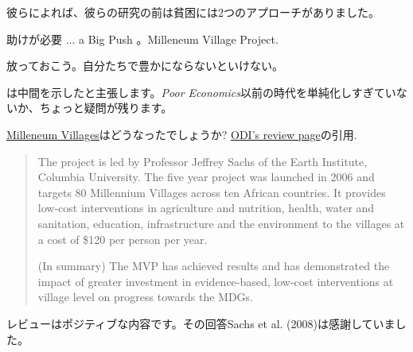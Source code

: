 \begin{frame}{}
彼らによれば\citep{BanerjeeDuflo2011book}、彼らの研究の前は貧困には2つのアプローチがありました。
\pause
\begin{description}[<+->]
\vspace{1.0ex}\setlength{\itemsep}{1.0ex}\setlength{\baselineskip}{12pt}
\item[Save them.] 助けが必要 ... a Big Push \citep{Sachs2006}。Milleneum Village Project.
\item[Can't save them.] 放っておこう。自分たちで豊かにならないといけない\citep{Easterly2006}。
\end{description}

\vspace{1ex}
\pause
\citet{BanerjeeDuflo2011book}は中間を示したと主張します。\textit{Poor Economics}以前の時代を単純化しすぎていないか、ちょっと疑問が残ります。
\end{frame}

\begin{frame}{}
\href{http://millenniumvillages.org/}{Milleneum Villages}はどうなったでしょうか? \href{http://www.odi.org/projects/765-millennium-villages-project-review}{ODI's review page}の引用.
\pause
\begin{quotation}
The project is led by Professor Jeffrey Sachs of the Earth Institute, Columbia University. The five year project was launched in 2006 and targets 80 Millennium Villages across ten African countries. It provides low-cost interventions in agriculture and nutrition, health, water and sanitation, education, infrastructure and the environment to the villages at a cost of \$120 per person per year.

\pause
(In summary) The MVP has achieved results and has demonstrated the impact of greater investment in evidence-based, low-cost interventions at village level on progress towards the MDGs. 
\end{quotation}

\pause
レビューはポジティブな内容です。その回答Sachs et al. (2008)は感謝していました。
\end{frame}

